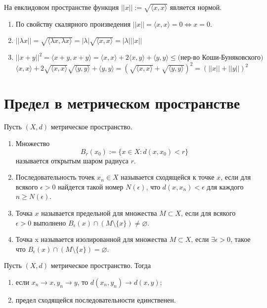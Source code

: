     \begin{corollary}
    	На евклидовом пространстве функция $||x|| := \sqrt{\langle x, x \rangle}$ является нормой.
    \end{corollary}
    
    \begin{enumerate}
    	\item По свойству скалярного произведения $||x|| = \langle x, x \rangle = 0 \Leftrightarrow x = 0$.
    	\item $||\lambda x|| = \sqrt{\langle \lambda x, \lambda x \rangle} = |\lambda| \sqrt{\langle x, x \rangle} = |\lambda| ||x||$
    	\item $||x + y||^2 = \langle x + y, x + y \rangle = \langle x, x \rangle + 2 \langle x, y \rangle + \langle y, y \rangle \leqslant \text{(нер-во Коши-Буняковского)}$ $\langle x, x \rangle + 2\sqrt{\langle x, x \rangle} \sqrt{\langle y, y \rangle} + \langle y, y \rangle = (\sqrt{\langle x, x \rangle} + \sqrt{\langle y, y \rangle})^2 = (||x|| + ||y||)^2$
    \end{enumerate}
    
    \section{Предел в метрическом пространстве}
    
    \begin{definition}
    	Пусть $(X, d)$ метрическое пространство.
    	\begin{enumerate}
    		\item Множество
    		\[ B_r(x_0) := \{x \in X: d(x, x_0) < r\} \]
    		называется открытым шаром радиуса $r$.
    		\item Последовательность точек $x_n \in X$ называется сходящейся к точке $x$, если для всякого $\epsilon > 0$ найдется такой номер $N(\epsilon)$, что $d(x, x_n) < \epsilon$ для каждого $n \geqslant N(\epsilon)$.
    		\item Точка $x$ называется предельной для множества $M \subset X$, если для всякого $\epsilon > 0$ выполнено $B_{\epsilon}(x) \cap (M \setminus \{x\}) \neq \varnothing.$
    		\item Точка x называется изолированной для множества $M \subset X$, если $\exists \epsilon > 0$, такое что 	$B_{\epsilon}(x) \cap (M \setminus \{x\}) = \varnothing$.
    	\end{enumerate}
    \end{definition}
    
    \begin{lemma}
    	Пусть $(X, d)$ метрическое пространство. Тогда
    	\begin{enumerate}
    		\item если $x_n \rightarrow x, y_n \rightarrow y$, то $d(x_n, y_n) \rightarrow d(x, y);$
    		\item предел сходящейся последовательности единственен.
    	\end{enumerate}
    \end{lemma}
    
